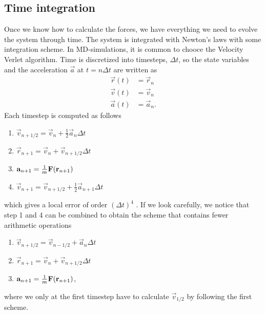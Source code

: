\subsection{Time integration}
Once we know how to calculate the forces, we have everything we need to evolve the system through time. The system is integrated with Newton's laws with some integration scheme. In MD-simulations, it is common to chooce the Velocity Verlet algorithm. Time is discretized into timesteps, $\Delta t$, so the state variables and the acceleration $\vec a$ at $t=n\Delta t$ are written as
\begin{align*}
	\vec r(t) & = \vec r_n\\
	\vec v(t) & = \vec v_n\\
	\vec a(t) & = \vec a_n.
\end{align*}
Each timestep is computed as follows
\begin{enumerate}
	\item $\vec v_{n+1/2} = \vec v_{n} + \frac{1}{2}\vec a_{n}\Delta t$
	\item $\vec r_{n+1} = \vec v_{n} + \vec v_{n+1/2}\Delta t$
	\item $\vec a_{n+1} = {1\over m}\vec F(\vec r_{n+1})$
	\item $\vec v_{n+1}   = \vec v_{n+1/2} + \frac{1}{2}\vec a_{n+1}\Delta t$
\end{enumerate}
which gives a local error of order $(\Delta t)^4$ \cite{allen1989computer}. If we look carefully, we notice that step 1 and 4 can be combined to obtain the scheme that contains fewer arithmetic operations
\begin{enumerate}
	\item $\vec v_{n+1/2} = \vec v_{n-1/2} + \vec a_{n}\Delta t$
	\item $\vec r_{n+1} = \vec v_{n} + \vec v_{n+1/2}\Delta t$
	\item $\vec a_{n+1} = {1\over m}\vec F(\vec r_{n+1})$,
\end{enumerate}
where we only at the first timestep have to calculate $\vec v_{1/2}$ by following the first scheme.


